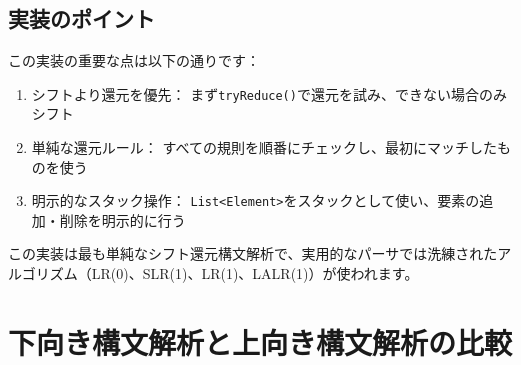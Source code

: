 \begin{Shaded}
\begin{Highlighting}[]
      \NormalTok{() \{}
                \NormalTok{ (}
\NormalTok{() {-} }\NormalTok{);}
\NormalTok{                \}}
\NormalTok{(} \NormalTok{()));}
                 \NormalTok{; }
\NormalTok{            \}}
\NormalTok{        \}}
         \NormalTok{; }
\NormalTok{    \}}
\NormalTok{\}}
\end{Highlighting}
\end{Shaded}

\hypertarget{chapter5-ux5b9fux88c5ux306eux30ddux30a4ux30f3ux30c8}{%
\subsection{実装のポイント}\label{chapter5-ux5b9fux88c5ux306eux30ddux30a4ux30f3ux30c8}}

この実装の重要な点は以下の通りです：

\begin{enumerate}
\def\labelenumi{\arabic{enumi}.}
\tightlist
\item
  シフトより還元を優先：
  まず\texttt{tryReduce()}で還元を試み、できない場合のみシフト
\item
  単純な還元ルール：
  すべての規則を順番にチェックし、最初にマッチしたものを使う
\item
  明示的なスタック操作：
  \texttt{List\textless{}Element\textgreater{}}をスタックとして使い、要素の追加・削除を明示的に行う
\end{enumerate}

この実装は最も単純なシフト還元構文解析で、実用的なパーサでは洗練されたアルゴリズム（LR(0)、SLR(1)、LR(1)、LALR(1)）が使われます。

\hypertarget{chapter5-ux4e0bux5411ux304dux69cbux6587ux89e3ux6790ux3068ux4e0aux5411ux304dux69cbux6587ux89e3ux6790ux306eux6bd4ux8f03}{%
\section{下向き構文解析と上向き構文解析の比較}\label{chapter5-ux4e0bux5411ux304dux69cbux6587ux89e3ux6790ux3068ux4e0aux5411ux304dux69cbux6587ux89e3ux6790ux306eux6bd4ux8f03}}

